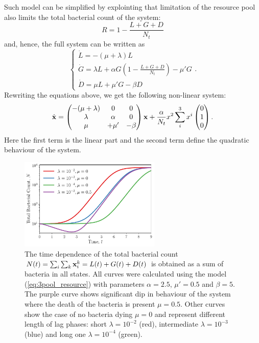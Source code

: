 \documentclass[10pt,A4paper]{article}
\begin{document}
Such model can be simplified by explointing that limitation of the resource pool also limits the total bacterial count of the system:
\begin{equation}
    R = 1 - \frac{L+G+D}{N_t}
\end{equation}
and, hence, the full system can be written as 
\begin{equation}
    \begin{cases}
        \dot{L} = -(\mu + \lambda) L\\
        \dot{G} = \lambda L + \alpha G\left(1-\frac{L+G+D}{N_t}\right)-\mu' G\\
        \dot{D} = \mu  L + \mu' G- \beta D 
        \label{eq:3pool_resource} 
    \end{cases}.
\end{equation}
Rewriting the equations above, we get the following non-linear system:
\begin{equation}
    \dot {\mathbf{x}} = \begin{pmatrix}
        -(\mu + \lambda) & 0       & 0 \\
         \lambda         & \alpha  & 0 \\
         \mu & + \mu'& - \beta 
    \end{pmatrix} 
    \mathbf{x} + \frac{\alpha}{N_t} x^2 \sum_i^3 x^i \begin{pmatrix} 0 \\ 1 \\ 0  \end{pmatrix}.
\end{equation}
Here the first term is the linear part and the second term define the quadratic behaviour of the system.
\begin{figure}[t]
    \begin{center}
    \includegraphics[width=0.6\textwidth]{Figures/pool_model_3pools_resource.pdf}
    \caption{{
        \footnotesize The time dependence of the total bacterial count $N(t) = \sum_i \sum_k \mathbf{x}_i^k = L(t) + G(t) + D(t)$ is obtained as a sum of bacteria in all states.
        All curves were calculated using the model (\ref{eq:3pool_resource}) with parameters $\alpha=2.5$, $\mu'=0.5$ and $\beta=5$.
        The purple curve shows significant dip in behaviour of the system where the death of the bacteria is present $\mu = 0.5$.
        Other curves show the case of no bacteria dying $\mu=0$ and represent different length of lag phases:
        short $\lambda=10^{-2}$ (red), intermediate $\lambda=10^{-3}$ (blue) and long one $\lambda=10^{-4}$ (green).
    }}
    \label{fig:3pool_resource_plots}
    \end{center}
\end{figure}
%
%
\end{document}
